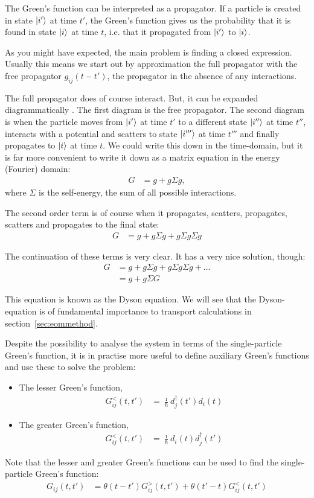 The Green's function can be interpreted as a propagator. If a particle is created in state $\ket{i'}$ at time $t'$, the Green's function gives us the probability that it is found in state $\ket{i}$ at time $t$, i.e. that it propagated from $\ket{i'}$ to $\ket{i}$.

As you might have expected, the main problem is finding a closed expression. Usually this means we start out by approximation the full propagator with the free propagator $g_{ij}(t-t')$, the propagator in the absence of any interactions. 

The full propagator does of course interact. But, it can be expanded diagrammatically \cite{mattuck}. The first diagram is the free propagator. The second diagram is when the particle moves from $\ket{i'}$ at time $t'$ to a different state $\ket{i''}$ at time $t''$, interacts with a potential and scatters to state $\ket{i'''}$ at time $t'''$ and finally propagates to $\ket{i}$ at time $t$. We could write this down in the time-domain, but it is far more convenient to write it down as a matrix equation in the energy (Fourier) domain:
\begin{align*}
G &= g + g \Sigma g,
\end{align*}
where $\Sigma$ is the self-energy, the sum of all possible interactions.

The second order term is of course when it propagates, scatters, propagates, scatters and propagates to the final state:
\begin{align*}
G &= g + g \Sigma g + g \Sigma g \Sigma g
\end{align*}

The continuation of these terms is very clear. It has a very nice solution, though:
\begin{align*}
G &= g + g \Sigma g + g \Sigma g \Sigma g+ \ldots \\
&= g + g \Sigma G
\end{align*}

This equation is known as the Dyson equation. We will see that the Dyson-equation is of fundamental importance to transport calculations in section~\ref{sec:eommethod}.

Despite the possibility to analyse the system in terms of the single-particle Green's function, it is in practise more useful to define auxiliary Green's functions and use these to solve the problem:
\begin{itemize}
\item The lesser Green's function, 
\begin{align*}
G^<_{ij}(t,t') &= \frac{\imath}{\hbar}d^\dagger_j(t')d_i(t)
\end{align*}
\item The greater Green's function, 
\begin{align*}
G^<_{ij}(t,t') &= \frac{\imath}{\hbar}d_i(t)d^\dagger_j(t')
\end{align*}
\end{itemize}
Note that the lesser and greater Green's functions can be used to find the single-particle Green's function:
\begin{align*}
G_{ij}(t,t') &= \theta(t-t')G^>_{ij} (t,t') + \theta(t'-t) G_{ij}^<(t,t')
\end{align*}

